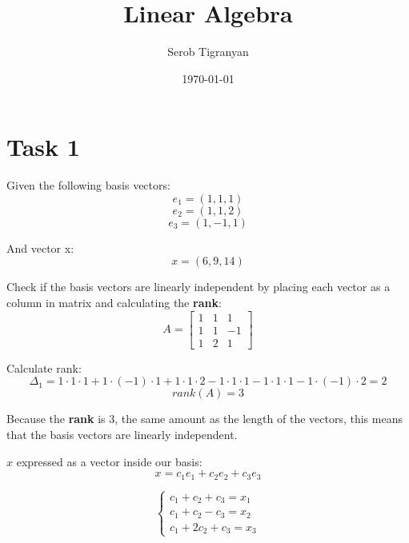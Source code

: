\documentclass[11pt]{article}
\author{Serob Tigranyan}
\date{\today}
\title{Linear Algebra}
\begin{document}
\maketitle
\tableofcontents

\newpage
\section{Task 1}
\label{sec:org11759b6}
Given the following basis vectors:
\[
e_1=(1,1,1)
\]
\[
e_2=(1,1,2)
\]
\[
e_3=(1,-1,1)
\]

And vector x:
\[
x=(6,9,14)
\]

Check if the basis vectors are linearly independent by placing each vector as a column in matrix and calculating the \textbf{rank}:
\[
 A =
 \begin{bmatrix}
 1 & 1 & 1 \\
 1 & 1 & -1 \\
 1 & 2 & 1
 \end{bmatrix}
\]

Calculate rank:
\[
\Delta_1 = 1 \cdot 1 \cdot 1 + 1 \cdot (-1) \cdot 1 + 1 \cdot 1 \cdot 2 - 1 \cdot 1 \cdot 1 - 1 \cdot 1 \cdot 1 - 1 \cdot (-1) \cdot 2 = 2
\]
\[
rank(A) = 3
\]

Because the \textbf{rank} is 3, the same amount as the length of the vectors, this means that the basis vectors are linearly independent.

\(x\) expressed as a vector inside our basis:
\[
x = c_1 e_1 + c_2 e_2 + c_3 e_3
\]

\[
 \left\{
 \begin{align}
 c_1 + c_2 + c_3 = x_1 \\
 c_1 + c_2 - c_3 = x_2 \\
 c_1 + 2c_2 + c_3 = x_3
 \end{align}
\]
\end{document}
